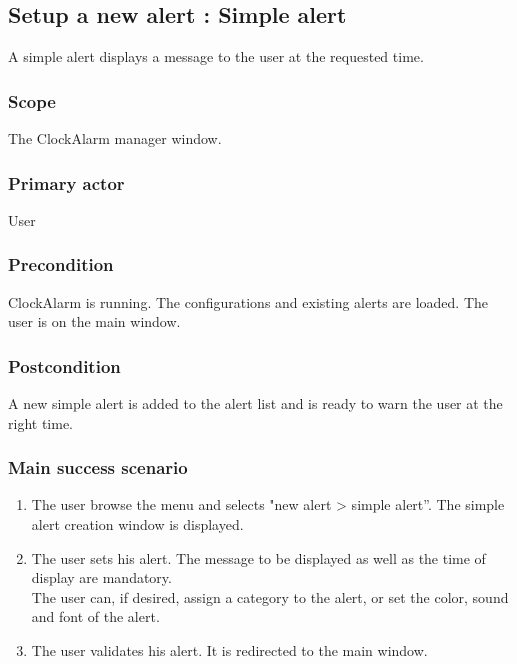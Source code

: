 \subsection{Setup a new alert : Simple alert}
A simple alert displays a message to the user at the requested time.
\subsubsection{Scope}
The ClockAlarm manager window.
\subsubsection{Primary actor}
User
\subsubsection{Precondition}
ClockAlarm is running. The configurations and existing alerts are loaded. The user is on the main window.
\subsubsection{Postcondition}
A new simple alert is added to the alert list and is ready to warn the user at the right time.
\subsubsection{Main success scenario}
\begin{enumerate}
	\item The user browse the menu and selects "new alert > simple alert''. The simple alert creation window is displayed. 
	\item \label{itm:enter} The user sets his alert. The message to be displayed as well as the time of display are mandatory. \\The user can, if desired, assign a category to the alert, or set the color, sound and font of the alert.
	\item \label{itm:validate} The user validates his alert. It is redirected to the main window.
\end{enumerate}
